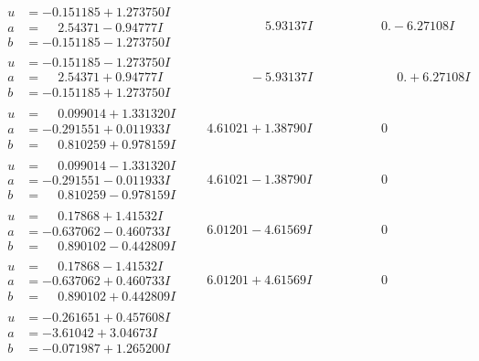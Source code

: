 \documentclass[1p]{elsarticle_modified}
\theoremstyle{definition}
\begin{document}
$$\begin{array}{c|c|c}
\begin{aligned}
u &= -0.151185 + 1.273750 I \\
a &= \phantom{-}2.54371 - 0.94777 I \\
b &= -0.151185 - 1.273750 I\end{aligned}
 & \phantom{-0.000000 -}5.93137 I & \phantom{-0.000000 } 0. - 6.27108 I \\ \hline\begin{aligned}
u &= -0.151185 - 1.273750 I \\
a &= \phantom{-}2.54371 + 0.94777 I \\
b &= -0.151185 + 1.273750 I\end{aligned}
 & \phantom{-0.000000 } -5.93137 I & \phantom{-0.000000 -}0. + 6.27108 I \\ \hline\begin{aligned}
u &= \phantom{-}0.099014 + 1.331320 I \\
a &= -0.291551 + 0.011933 I \\
b &= \phantom{-}0.810259 + 0.978159 I\end{aligned}
 & \phantom{-}4.61021 + 1.38790 I & \phantom{-0.000000 } 0 \\ \hline\begin{aligned}
u &= \phantom{-}0.099014 - 1.331320 I \\
a &= -0.291551 - 0.011933 I \\
b &= \phantom{-}0.810259 - 0.978159 I\end{aligned}
 & \phantom{-}4.61021 - 1.38790 I & \phantom{-0.000000 } 0 \\ \hline\begin{aligned}
u &= \phantom{-}0.17868 + 1.41532 I \\
a &= -0.637062 - 0.460733 I \\
b &= \phantom{-}0.890102 - 0.442809 I\end{aligned}
 & \phantom{-}6.01201 - 4.61569 I & \phantom{-0.000000 } 0 \\ \hline\begin{aligned}
u &= \phantom{-}0.17868 - 1.41532 I \\
a &= -0.637062 + 0.460733 I \\
b &= \phantom{-}0.890102 + 0.442809 I\end{aligned}
 & \phantom{-}6.01201 + 4.61569 I & \phantom{-0.000000 } 0 \\ \hline\begin{aligned}
u &= -0.261651 + 0.457608 I \\
a &= -3.61042 + 3.04673 I \\
b &= -0.071987 + 1.265200 I\end{aligned}

\end{array}$$
\end{document}
